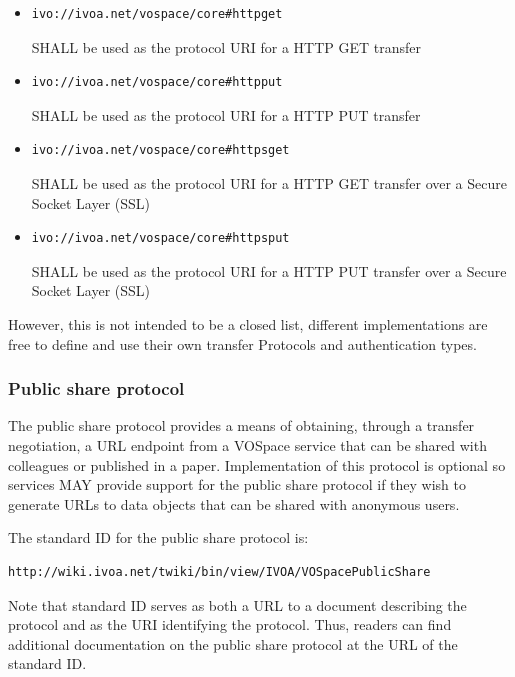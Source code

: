 \documentclass[11pt,a4paper]{ivoa}
\begin{document}
\begin{itemize}
    \item \begin{verbatim}ivo://ivoa.net/vospace/core#httpget\end{verbatim} SHALL be used as the protocol URI for a HTTP GET transfer
    \item \begin{verbatim}ivo://ivoa.net/vospace/core#httpput\end{verbatim} SHALL be used as the protocol URI for a HTTP PUT transfer
    \item \begin{verbatim}ivo://ivoa.net/vospace/core#httpsget\end{verbatim} SHALL be used as the protocol URI for a HTTP GET transfer over a Secure Socket Layer (SSL)
    \item \begin{verbatim}ivo://ivoa.net/vospace/core#httpsput\end{verbatim} SHALL be used as the protocol URI for a HTTP PUT transfer over a Secure Socket Layer (SSL)
\end{itemize}

However, this is not intended to be a closed list, different implementations are free to define and use their own transfer Protocols and authentication types.

\subsubsection{Public share protocol}
\label{subsubsec:public share protocol}

The public share protocol provides a means of obtaining, through a transfer negotiation, a URL endpoint from a VOSpace service that can be shared with colleagues or published in a paper.  Implementation of this protocol is optional so services MAY provide support for the public share protocol if they wish to generate URLs to data objects that can be shared with anonymous users.

The standard ID for the public share protocol is:
\begin{verbatim}http://wiki.ivoa.net/twiki/bin/view/IVOA/VOSpacePublicShare\end{verbatim}

Note that standard ID serves as both a URL to a document describing the protocol and as the URI identifying the protocol.  Thus, readers can find additional documentation on the public share protocol at the URL of the standard ID.
\end{document}
